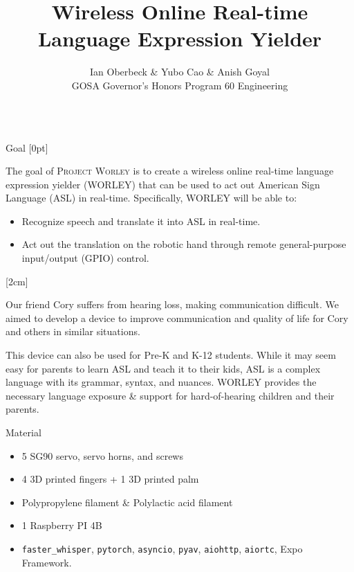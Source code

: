 \documentclass[final, 20pt]{beamer}
\title{Wireless Online Real-time Language Expression Yielder}
\author{Ian Oberbeck \& Yubo Cao \& Anish Goyal \\\normalfont\selectfont GOSA Governor's Honors Program 60 Engineering}
\newlength{\colwidth}
\begin{document}
\begin{frame}[t]
  \centering
  \begin{columns}[t]
    \margincolumn

    \begin{column}{\colwidth}


      \begin{block}{Goal}
        [0pt]

        The goal of \textsc{Project Worley} is to create a wireless online real-time language expression yielder (WORLEY) that can be used to act out American Sign Language (ASL) in real-time. Specifically, WORLEY will be able to:

        \begin{itemize}
          \item Recognize speech and translate it into ASL in real-time.
          \item Act out the translation on the robotic hand through remote general-purpose input/output (GPIO) control.
        \end{itemize}

        [2cm]

        Our friend Cory suffers from hearing loss, making communication difficult. We aimed to develop a device to improve communication and quality of life for Cory and others in similar situations.

        This device can also be used for Pre-K and K-12 students.  While it may seem easy for parents to learn ASL and teach it to their kids, ASL is a complex language with its grammar, syntax, and nuances. WORLEY provides the necessary language exposure \& support for hard-of-hearing children and their parents.
      \end{block}

      \begin{block}{Material}
        \begin{itemize}
          \item 5 SG90 servo, servo horns, and screws
          \item 4 3D printed fingers + 1 3D printed palm
          \item Polypropylene filament \& Polylactic acid filament
          \item 1 Raspberry PI 4B
          \item \texttt{faster\_whisper}, \texttt{pytorch}, \texttt{asyncio}, \texttt{pyav}, \texttt{aiohttp}, \texttt{aiortc}, Expo Framework.
        \end{itemize}
      \end{block}
    \end{column}


\end{columns}
\end{frame}
\end{document}
